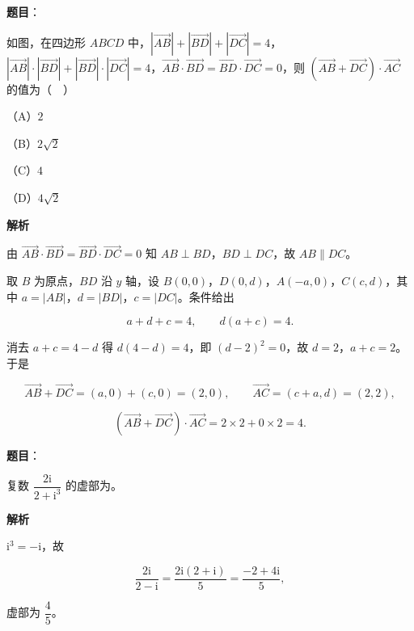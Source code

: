 \begin{answer}

\textbf{题目}：

如图，在四边形 $ABCD$ 中，$\left|\overrightarrow{AB}\right|+\left|\overrightarrow{BD}\right|+\left|\overrightarrow{DC}\right|=4$，$\left|\overrightarrow{AB}\right|\cdot\left|\overrightarrow{BD}\right|+\left|\overrightarrow{BD}\right|\cdot\left|\overrightarrow{DC}\right|=4$，$\overrightarrow{AB}\cdot\overrightarrow{BD}=\overrightarrow{BD}\cdot\overrightarrow{DC}=0$，则 $\left(\overrightarrow{AB}+\overrightarrow{DC}\right)\cdot\overrightarrow{AC}$ 的值为（　）
\nopagebreak[4]
\begin{center}\end{center}
\nopagebreak[4]
（A）$2$

（B）$2\sqrt2$

（C）$4$

（D）$4\sqrt2$

\textbf{解析}

由 $\overrightarrow{AB}\cdot\overrightarrow{BD}=\overrightarrow{BD}\cdot\overrightarrow{DC}=0$ 知 $AB\perp BD$，$BD\perp DC$，故 $AB\parallel DC$。

取 $B$ 为原点，$BD$ 沿 $y$ 轴，设 $B(0,0)$，$D(0,d)$，$A(-a,0)$，$C(c,d)$，其中 $a=|AB|$，$d=|BD|$，$c=|DC|$。条件给出

\nopagebreak[4]
\[a+d+c=4,\qquad d(a+c)=4.\]

消去 $a+c=4-d$ 得 $d(4-d)=4$，即 $(d-2)^2=0$，故 $d=2$，$a+c=2$。于是

\nopagebreak[4]
\[\overrightarrow{AB}+\overrightarrow{DC}=(a,0)+(c,0)=(2,0),\qquad \overrightarrow{AC}=(c+a,d)=(2,2),\]

\nopagebreak[4]
\[\left(\overrightarrow{AB}+\overrightarrow{DC}\right)\cdot\overrightarrow{AC}=2\times2+0\times2=4.\]


\end{answer}
\begin{answer}

\textbf{题目}：

复数 $\dfrac{2\mathrm i}{2+\mathrm i^3}$ 的虚部为\gkblank{}。

\textbf{解析}

$\mathrm i^3=-\mathrm i$，故

\nopagebreak[4]
\[\frac{2\mathrm i}{2-\mathrm i}=\frac{2\mathrm i(2+\mathrm i)}{5}=\frac{-2+4\mathrm i}5,\]

虚部为 $\dfrac45$。


\end{answer}
